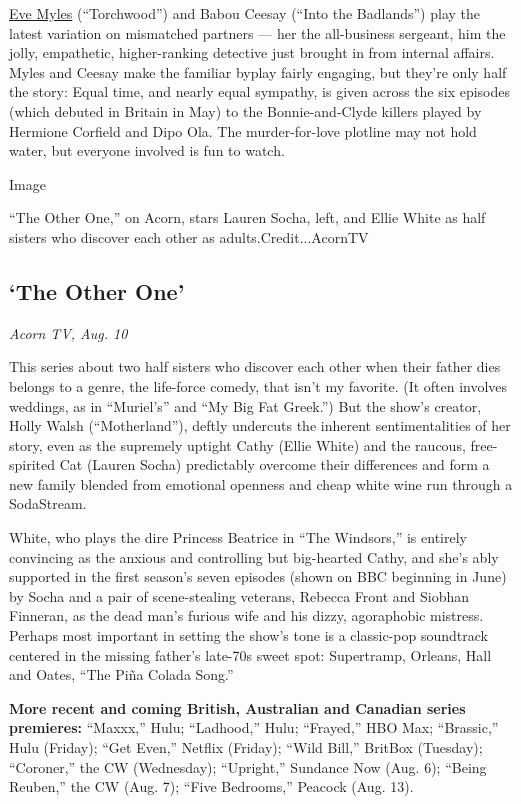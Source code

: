 \href{https://www.nytimes.com/2019/08/30/arts/television/keeping-faith-eve-myles.html?searchResultPosition=2}{Eve
Myles} (``Torchwood'') and Babou Ceesay (``Into the Badlands'') play the
latest variation on mismatched partners --- her the all-business
sergeant, him the jolly, empathetic, higher-ranking detective just
brought in from internal affairs. Myles and Ceesay make the familiar
byplay fairly engaging, but they're only half the story: Equal time, and
nearly equal sympathy, is given across the six episodes (which debuted
in Britain in May) to the Bonnie-and-Clyde killers played by Hermione
Corfield and Dipo Ola. The murder-for-love plotline may not hold water,
but everyone involved is fun to watch.

Image

``The Other One,'' on Acorn, stars Lauren Socha, left, and Ellie White
as half sisters who discover each other as adults.Credit...AcornTV

\hypertarget{the-other-one}{%
\subsection{`The Other One'}\label{the-other-one}}

\emph{Acorn TV, Aug. 10}

This series about two half sisters who discover each other when their
father dies belongs to a genre, the life-force comedy, that isn't my
favorite. (It often involves weddings, as in ``Muriel's'' and ``My Big
Fat Greek.'') But the show's creator, Holly Walsh (``Motherland''),
deftly undercuts the inherent sentimentalities of her story, even as the
supremely uptight Cathy (Ellie White) and the raucous, free-spirited Cat
(Lauren Socha) predictably overcome their differences and form a new
family blended from emotional openness and cheap white wine run through
a SodaStream.

White, who plays the dire Princess Beatrice in ``The Windsors,'' is
entirely convincing as the anxious and controlling but big-hearted
Cathy, and she's ably supported in the first season's seven episodes
(shown on BBC beginning in June) by Socha and a pair of scene-stealing
veterans, Rebecca Front and Siobhan Finneran, as the dead man's furious
wife and his dizzy, agoraphobic mistress. Perhaps most important in
setting the show's tone is a classic-pop soundtrack centered in the
missing father's late-70s sweet spot: Supertramp, Orleans, Hall and
Oates, ``The Piña Colada Song.''

\textbf{More recent and coming British, Australian and Canadian series
premieres:} ``Maxxx,'' Hulu; ``Ladhood,'' Hulu; ``Frayed,'' HBO Max;
``Brassic,'' Hulu (Friday); ``Get Even,'' Netflix (Friday); ``Wild
Bill,'' BritBox (Tuesday); ``Coroner,'' the CW (Wednesday); ``Upright,''
Sundance Now (Aug. 6); ``Being Reuben,'' the CW (Aug. 7); ``Five
Bedrooms,'' Peacock (Aug. 13).

